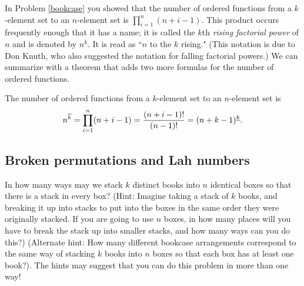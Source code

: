 In Problem \ref{bookcase} you showed that the number of ordered functions
from a $k$-element set to an $n$-element set is $\displaystyle
\prod_{i=1}^n (n+i-1)$.  This product occurs frequently enough that it
has a name; it is called the $k$\/th {\em rising factorial
power} of
$n$ and is denoted by $n^{\overline{k}}$.  It is
read as ``$n$ to the
$k$ rising." (This notation is due to Don Knuth, who also suggested the
notation for falling factorial powers.)  We can summarize
with a theorem that adds two more
formulas for the number of ordered
functions.
\begin{theorem} The number of ordered functions from a $k$-element set to
an $n$-element set is
$$n^{\overline{k}}=\prod_{i=1}^n (n+i-1) = {(n+i-1)!\over (n-1)!} =
(n+k-1)^{\underline{k}}.$$\end{theorem}

\subsection{Broken permutations and Lah numbers}  
\bp  
\itemesi In how many ways may we stack $k$ distinct books into $n$
identical boxes so that there is a stack in every box? (Hint:  Imagine
taking a stack of
$k$ books, and breaking it up into stacks to put into the boxes in the
same order they were originally stacked.  If you are going to use $n$
boxes, in how many places will you have to break the stack up into smaller
stacks, and how many ways can you do this?)  (Alternate hint: How many
different bookcase arrangements correspond to the same way of stacking
$k$ books into $n$ boxes so that each box has at least one book?).  The
hints may suggest that you can do this problem in more than one way!
\label{brokenpermutation}
\ep

